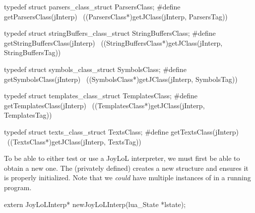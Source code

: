 typedef struct parsers_class_struct ParsersClass;
#define getParsersClass(jInterp)                            \
  ((ParsersClass*)getJClass(jInterp, ParsersTag))

typedef struct stringBuffers_class_struct StringBuffersClass;
#define getStringBuffersClass(jInterp)                      \
  ((StringBuffersClass*)getJClass(jInterp, StringBuffersTag))

typedef struct symbols_class_struct SymbolsClass;
#define getSymbolsClass(jInterp)                            \
  ((SymbolsClass*)getJClass(jInterp, SymbolsTag))
  
typedef struct templates_class_struct TemplatesClass;
#define getTemplatesClass(jInterp)                          \
  ((TemplatesClass*)getJClass(jInterp, TemplatesTag))

typedef struct texts_class_struct TextsClass;
#define getTextsClass(jInterp)                              \
  ((TextsClass*)getJClass(jInterp, TextsTag))
\stopCHeader

\startTestSuite[newJoyLoLInterp]

To be able to either test or use a JoyLoL interpreter, we must first be 
able to obtain a new one. The (privately defined)  
creates a new  structure and ensures it is properly 
initialized. Note that we \emph{could} have multiple instances of 
 in a running program. 

\setCHeaderStream{private}
\startCHeader
extern JoyLoLInterp* newJoyLoLInterp(lua_State *lstate);
\stopCHeader
{}

